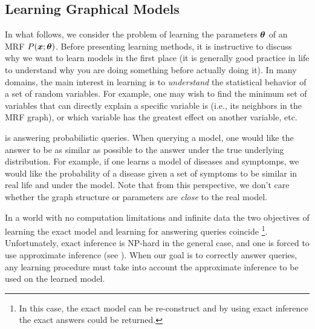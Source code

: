 \subsection{Learning Graphical Models}
\label{sec:learning}
In what follows, we consider the problem of learning the parameters $\boldsymbol{\theta}$ of an MRF $P(\boldsymbol{x};\boldsymbol{\theta})$.
Before presenting learning methods, it is instructive to discuss why we want to learn models in the first place (it is generally good practice in life to understand why you are doing something before actually doing it). 
In many domains, the main interest in learning is to {\em understand} the statistical behavior of a set of random variables.
For example, one may wish to find the minimum set of variables that can directly explain a specific variable is (i.e., its neighbors in the MRF graph), or which variable has the greatest effect on another variable, etc.


  is answering probabilistic queries.
When querying a model, one would like the answer to be as similar as possible to the answer under the true underlying distribution.
For example, if one learns a model of diseases and symptomps, we would like the probability of a disease given a set of symptoms to be similar in real life and under the model.
Note that from this perspective, we don't care whether the graph structure or parameters are {\em close} to the real model. 

In a world with no computation limitations and infinite data the two objectives of learning the exact model and learning for answering queries coincide
\footnote{In this case, the exact model can be re-construct and by using exact inference the exact answers could be returned.}.
Unfortunately, exact inference is NP-hard in the general case, and one is forced to use approximate inference (see ).
When our goal is to correctly answer queries, any learning procedure must take into account the approximate inference to be used on the learned model.


